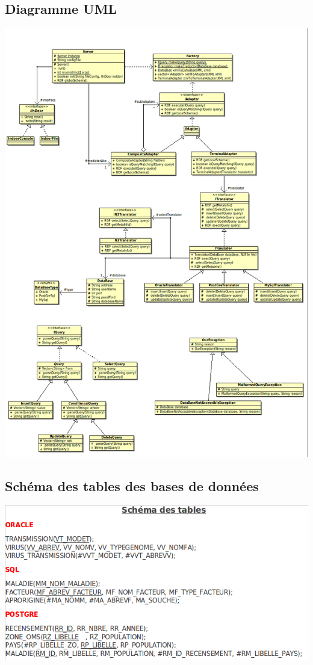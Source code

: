 \documentclass[12pt]{article}
\begin{document}
\subsection{Diagramme UML}

\begin{center}
	\includegraphics[scale=0.50]{images/uml.png}
\end{center}

\subsection{Schéma des tables des bases de données}

\begin{center}
	\includegraphics[scale=0.70]{images/SchemaDesTables.png}
\end{center}
\end{document}
